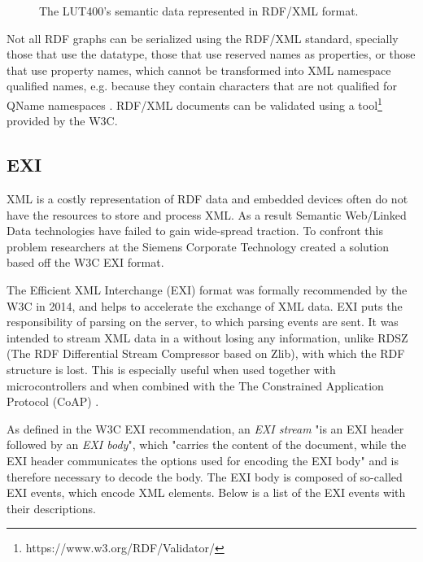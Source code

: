 \begin{figure}[th]
	\centering
	\resizebox{\textwidth}{!}{}
    \caption{The LUT400's semantic data represented in RDF/XML format.}
    \label{fig:rdfxml}
\end{figure}


 
Not all RDF graphs can be serialized using the RDF/XML standard, specially those that use the  datatype, those that use reserved names as properties, or those that use property names, which cannot be transformed into XML namespace qualified names, e.g. because they contain characters that are not qualified for QName namespaces \cite{RDFXML.02.10.2017}. RDF/XML documents can be validated using a tool\footnote{https://www.w3.org/RDF/Validator/} provided by the W3C.
 
 
\subsection{EXI}
XML is a costly representation of RDF data and embedded devices often do not have the resources to store and process XML. As a result Semantic Web/Linked Data technologies have failed to gain wide-spread traction. To confront this problem researchers at the Siemens Corporate Technology created a solution based off the W3C EXI format. \cite{Kabisch.2015}

The Efficient XML Interchange (EXI) format was formally recommended by the W3C in 2014, and helps to accelerate the exchange of XML data. EXI puts the responsibility of parsing on the server, to which parsing events are sent. It was intended to stream XML data in a without losing any information, unlike RDSZ (The RDF Differential Stream Compressor based on Zlib), with which the RDF structure is lost. This is especially useful when used together with microcontrollers \cite{Kabisch.2015} and when combined with the The Constrained Application Protocol (CoAP) \cite{castellani2011web}. 

As defined in the W3C EXI recommendation, an \textit{EXI stream} "is an EXI header followed by an \textit{EXI body}", which "carries the content of the document, while the EXI header communicates the options used for encoding the EXI body" and is therefore necessary to decode the body. The EXI body is composed of so-called EXI events, which encode XML elements. Below is a list of the EXI events with their descriptions. \cite{.02.10.2017b}


